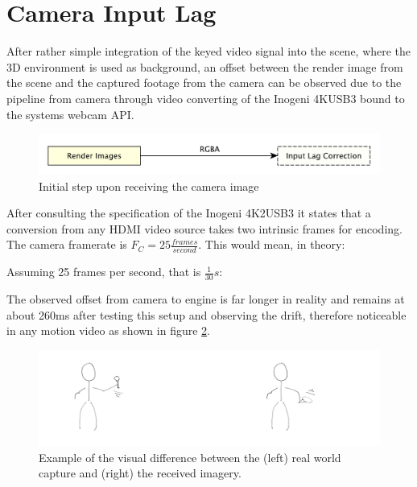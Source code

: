 %
\section{Camera Input Lag}

After rather simple integration of the keyed video signal into the scene, where 
the 3D environment is used as background, an offset between the render image 
from the scene and the captured footage from the camera can be observed due to 
the pipeline from camera through video converting of the Inogeni 4KUSB3 bound 
to the systems webcam API.

\begin{figure}[htb]
	\includegraphics[width=\textwidth]{_raw_resources/pipeline_steps/4_2_swapper.pdf}
	\caption{Initial step upon receiving the camera image}
	\label{fig:steps:swapper}
\end{figure}

After consulting the specification of the Inogeni 
4K2USB3 it states that a conversion from any HDMI video source takes two 
intrinsic frames for encoding. The camera framerate is $F_C = 25 
\frac{frames}{second}$. This would mean, in theory:


Assuming 25 frames per second, that is $\frac{1}{30}s$:



The observed offset from camera to engine is far longer in reality and remains 
at about 260ms after testing this setup and observing the drift, therefore 
noticeable in any motion video as shown in figure \ref{fig:offsets:example}.

\begin{figure}[htb]
	\includegraphics[width=\textwidth]{_raw_resources/offsets/motion-difference.png}
	\caption{Example of the visual difference between the (left) real world 
	capture and (right) the received imagery.}
	\label{fig:offsets:example}
\end{figure}


